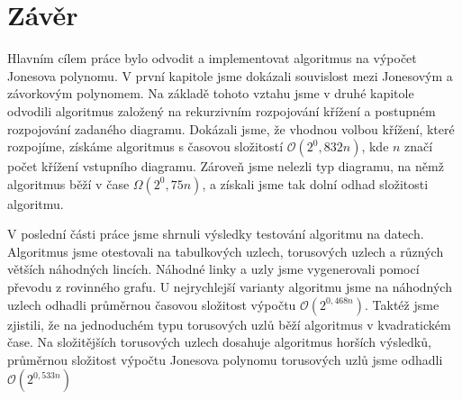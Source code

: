 \chapter*{Závěr}

Hlavním cílem práce bylo odvodit a implementovat algoritmus na výpočet Jonesova polynomu. V první kapitole jsme dokázali souvislost mezi Jonesovým a závorkovým polynomem.  Na základě tohoto vztahu jsme v druhé kapitole odvodili algoritmus založený na rekurzivním rozpojování křížení a postupném rozpojování zadaného diagramu. Dokázali jsme, že vhodnou volbou křížení, které rozpojíme, získáme algoritmus s časovou složitostí $\mathcal{O}(2^0,832 n)$, kde $n$ značí počet křížení vstupního diagramu. Zároveň jsme nelezli typ diagramu, na němž algoritmus běží v čase $\Omega (2^0,75 n)$, a získali jsme tak dolní odhad složitosti algoritmu.

V poslední části práce jsme shrnuli výsledky testování algoritmu na datech. Algoritmus jsme otestovali na tabulkových uzlech, torusových uzlech a různých větších náhodných lincích. Náhodné linky a uzly jsme vygenerovali pomocí převodu z rovinného grafu. U nejrychlejší varianty algoritmu  jsme na náhodných uzlech odhadli průměrnou časovou složitost výpočtu $\mathcal{O}(2^{0,468n})$. Taktéž jsme zjistili, že na jednoduchém typu torusových uzlů běží algoritmus v kvadratickém čase. Na složitějších torusových uzlech dosahuje algoritmus horších výsledků, průměrnou složitost výpočtu Jonesova polynomu torusových uzlů jsme odhadli $\mathcal{O}(2^{0,533n})$
